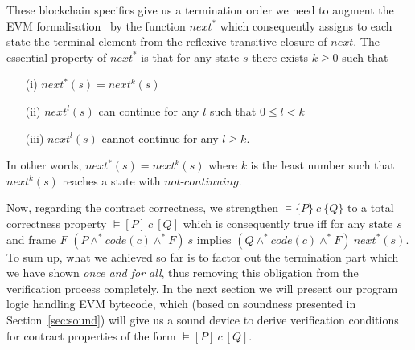 \documentclass[sigplan,10pt,review]{acmart}\settopmatter{printfolios=true,printccs=false,printacmref=false}
\newcommand{\sconj}{\wedge^*}
\newcommand{\pvalid}[3]{\models\{#1\}\:#2\:\{#3\}}
\newcommand{\tvalid}[3]{\models[#1]\:#2\:[#3]}
\newcommand{\xnext}{\mathit{next}}
\newcommand{\code}[1]{\mathit{code}(#1)}
\newcommand{\ncont}{\mathit{not\mbox{-}continuing}}
\begin{document}
These blockchain specifics give us a termination order we need   
to augment the EVM formalisation~\cite{Yoichi} by the function $\xnext^*$ which 
consequently assigns to each state the terminal element from the reflexive-transitive closure of $\xnext$. 
The essential property of $\xnext^*$ is that for any state $s$ there exists $k \geq 0$ such that
\begin{itemize}
\item[(i)] $\xnext^*(s) = \xnext^k(s)$
\item[(ii)] $\xnext^l(s)$ can continue for any $l$ such that $0 \le l < k$
\item[(iii)] $\xnext^l(s)$ cannot continue for any $l \ge k$.
\end{itemize}
In other words, $\xnext^*(s) = \xnext^k(s)$ where $k$ is the least number such that
$\xnext^k(s)$ reaches a state with $\ncont$. 

Now, regarding the contract correctness, we strengthen $\pvalid{P}{c}{Q}$ to 
a total correctness property $\tvalid{P}{c}{Q}$ which is consequently true iff
for any state $s$ and frame $F$ 
$(P \sconj \code{c} \sconj F)\: s$ implies $(Q \sconj \code{c} \sconj F)\: \xnext^*(s)$. 
To sum up, what we achieved so far is to factor out the termination part which we have 
shown \emph{once and for all}, thus removing this obligation from the verification
process completely. In the next section we will present our program logic handling EVM bytecode, 
which (based on soundness presented in Section~\ref{sec:sound}) will give us 
a sound device to derive verification conditions for contract properties of the form $\tvalid{P}{c}{Q}$.   
%       
\end{document}
